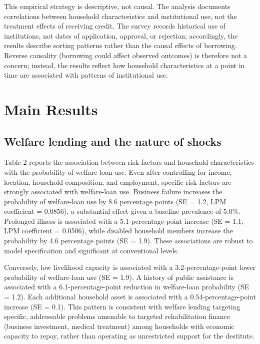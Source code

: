\documentclass[12pt,a4paper]{article}
\begin{document}
This empirical strategy is descriptive, not causal. The analysis documents correlations between household characteristics and institutional use, not the treatment effects of receiving credit. The survey records historical use of institutions, not dates of application, approval, or rejection; accordingly, the results describe sorting patterns rather than the causal effects of borrowing. Reverse causality (borrowing could affect observed outcomes) is therefore not a concern; instead, the results reflect how household characteristics at a point in time are associated with patterns of institutional use.

\section{Main Results}

\subsection{Welfare lending and the nature of shocks}

Table 2 reports the association between risk factors and household characteristics with the probability of welfare-loan use. Even after controlling for income, location, household composition, and employment, specific risk factors are strongly associated with welfare-loan use. Business failure increases the probability of welfare-loan use by 8.6 percentage points (SE = 1.2, LPM coefficient = 0.0856), a substantial effect given a baseline prevalence of 5.0\%. Prolonged illness is associated with a 5.1-percentage-point increase (SE = 1.1, LPM coefficient = 0.0506), while disabled household members increase the probability by 4.6 percentage points (SE = 1.9). These associations are robust to model specification and significant at conventional levels.

Conversely, low livelihood capacity is associated with a 3.2-percentage-point lower probability of welfare-loan use (SE = 1.9). A history of public assistance is associated with a 6.1-percentage-point reduction in welfare-loan probability (SE = 1.2). Each additional household asset is associated with a 0.54-percentage-point increase (SE = 0.1). This pattern is consistent with welfare lending targeting specific, addressable problems amenable to targeted rehabilitation finance (business investment, medical treatment) among households with economic capacity to repay, rather than operating as unrestricted support for the destitute.
\end{document}
